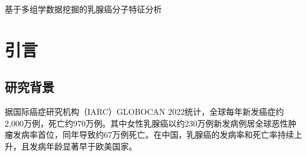 \documentclass[12pt,a4paper,openany]{ctexbook}
\begin{document}


\setcounter{page}{1}

\begin{center}
{\heiti\Large 基于多组学数据挖掘的乳腺癌分子特征分析}
\end{center}
\vspace{2em}
\begin{abstract}
\noindent 乳腺癌是全球发病率最高的恶性肿瘤，其分子异质性是精准诊疗面临的核心挑战。本研究基于TCGA-BRCA多组学数据（mRNA转录组25,981个基因、miRNA表达谱1,881个、体细胞突变15,413个基因及临床注释94项），对1,076例多组学共同患者进行了系统性的数据挖掘分析。研究综合运用DESeq2差异表达分析、LASSO和随机森林分类、PCA/t-SNE聚类、WGCNA共表达网络、Cox比例风险回归、maftools突变景观分析、g:Profiler功能富集分析、arules关联规则挖掘及ConsensusClusterPlus共识聚类等算法。主要结果包括：鉴定6,768个显著差异表达基因（$|\log_2\text{FC}|>1$, FDR$<0.05$），其中上调4,334个、下调2,434个；LASSO分类器以89.4\%准确率实现三分类分子亚型预测，仅使用35个基因；WGCNA识别8个有效共表达模块（另含grey未分配基因集），blue模块枢纽基因模块隶属度达0.959；多变量Cox模型C-index为0.771，Stage IV风险比达30.36（95\%CI: 9.87--93.45）；PIK3CA（37.3\%）和TP53（35.2\%）为最高频突变基因；功能富集揭示上调基因显著富集于细胞周期通路（Reactome Cell Cycle, 187个基因, $p=1.5\times10^{-21}$）。本研究为乳腺癌多组学数据挖掘提供了完整分析框架。

\vspace{1em}
\vspace{1em}：乳腺癌；TCGA；多组学数据挖掘；差异表达分析；WGCNA；预后模型
\end{abstract}

\newpage
\tableofcontents
\newpage
\listoffigures
\newpage
\listoftables
\newpage
{}
\setcounter{page}{1}
\chapter{引言}

\section{研究背景}
据国际癌症研究机构（IARC）GLOBOCAN 2022统计，全球每年新发癌症约2,000万例，死亡约970万例\cite{sung2024global}。其中女性乳腺癌以约230万例新发病例居全球恶性肿瘤发病率首位，同年导致约67万例死亡。在中国，乳腺癌的发病率和死亡率持续上升，且发病年龄显著早于欧美国家。
\end{document}
